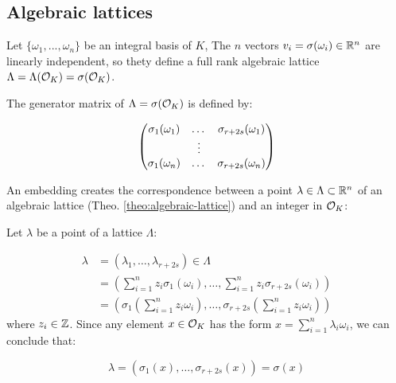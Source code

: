 \documentclass[Ingles]{ic-tese-v3}
\begin{document}
\subsection{Algebraic lattices}
\label{sec:org0823cae}

\begin{theorem}[]\label{theo:algebraic-lattice}
Let $\{\omega_1,...,\omega_n\}$ be an integral basis of $K$, The $n$ vectors $v_i = \sigma(\omega_i)
\in \mathbb{R}^n$ are linearly independent, so thety define a full rank algebraic lattice
$\Lambda = \Lambda(\mathcal{O}_K) = \sigma(\mathcal{O}_K)$.
\end{theorem} 
The generator matrix of \(\Lambda = \sigma(\mathcal{O}_K)\) is defined by:

\begin{equation}
  \label{def:gen-matrix-alg-lattices}
  \begin{pmatrix}
    \sigma_1(\omega_1) & $\dots$ &  \sigma_{r+2s}(\omega_1) \\
    & \vdots & \\
    \sigma_1(\omega_n) & $\dots$ & \sigma_{r+2s}(\omega_n) \\
  \end{pmatrix}  
\end{equation}

\begin{remark}\label{rem:lat-int-correspondence}
  An embedding creates the correspondence between a point $\lambda \in \Lambda \subset \mathbb{R}^n$ of an algebraic lattice (Theo.
  \ref{theo:algebraic-lattice}) and an integer in $\mathcal{O}_K$:

  Let $\lambda$ be a point of a lattice $\Lambda$:

\begin{align*} 
     \lambda &= (\lambda_1,\dots,\lambda_{r+2s}) \in \Lambda \\
       &= \left( \sum_{i=1}^n{z_i\sigma_1(\omega_i)} , \dots , \sum_{i=1}^n{z_i\sigma_{r+2s}(\omega_i)} \right) \\
       &= \left( \sigma_1\left(   \sum_{i=1}^n{z_i\omega_i} \right) , \dots , \sigma_{r+2s} \left( \sum_{i=1}^n{z_i\omega_i}  \right) \right) 
\end{align*}
  where $z_i \in \mathbb{Z}$. Since any element $x \in \mathcal{O}_K$ has the form $x =
  \sum_{i=1}^n{\lambda_i\omega_i}$, we can conclude that:

  \begin{equation*}
    \lambda = \left( \sigma_1(x), \dots, \sigma_{r+2s}(x) \right) = \sigma(x)
  \end{equation*}

\end{remark}
\end{document}
